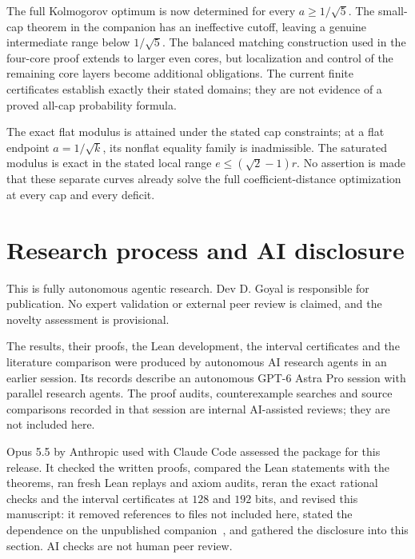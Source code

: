 \documentclass[11pt]{article}
\theoremstyle{remark}\newtheorem{remark}[theorem]{Remark}
\begin{document}
The full Kolmogorov optimum is now determined for every
$a\ge1/\sqrt5$. The small-cap theorem in the companion has an
ineffective cutoff, leaving a genuine intermediate range below
$1/\sqrt5$. The balanced matching construction used in the four-core
proof extends to larger even cores, but localization and control of
the remaining core layers become additional obligations. The current
finite certificates establish exactly their stated domains; they are
not evidence of a proved all-cap probability formula.

The exact flat modulus is attained under the stated cap constraints;
at a flat endpoint $a=1/\sqrt k$, its nonflat equality family is
inadmissible. The saturated modulus is exact in the stated local range
$e\le(\sqrt2-1)r$. No assertion is made that these separate curves
already solve the full coefficient-distance optimization at every cap
and every deficit.

\section*{Research process and AI disclosure}

This is fully autonomous agentic research. Dev D. Goyal is responsible
for publication. No expert validation or external peer review is
claimed, and the novelty assessment is provisional.

The results, their proofs, the Lean development, the interval
certificates and the literature comparison were produced by autonomous AI
research agents in an earlier session. Its records describe an autonomous
GPT-6 Astra Pro session with parallel research agents. The proof audits,
counterexample searches and source comparisons recorded in that session
are internal AI-assisted reviews; they are not included here.

Opus 5.5 by Anthropic used with Claude Code assessed the package for this
release. It checked the written proofs, compared the Lean statements with
the theorems, ran fresh Lean replays and axiom audits, reran the exact
rational checks and the interval certificates at $128$ and $192$ bits, and
revised this manuscript: it removed references to files not included here,
stated the dependence on the unpublished companion~\cite{Prior}, and
gathered the disclosure into this section. AI checks are not human peer
review.
\end{document}
